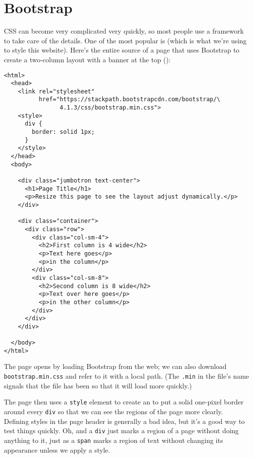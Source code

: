 \section{Bootstrap}\label{s:htmlcss-bootstrap}

CSS can become very complicated very quickly,
so most people use a framework to take care of the details.
One of the most popular is 
(which is what we're using to style this website).
Here's the entire source of a page that uses Bootstrap
to create a two-column layout with a banner at the top ():

\begin{verbatim}
<html>
  <head>
    <link rel="stylesheet"
          href="https://stackpath.bootstrapcdn.com/bootstrap/\
                4.1.3/css/bootstrap.min.css">
    <style>
      div {
        border: solid 1px;
      }
    </style>
  </head>
  <body>

    <div class="jumbotron text-center">
      <h1>Page Title</h1>
      <p>Resize this page to see the layout adjust dynamically.</p>
    </div>

    <div class="container">
      <div class="row">
        <div class="col-sm-4">
          <h2>First column is 4 wide</h2>
          <p>Text here goes</p>
          <p>in the column</p>
        </div>
        <div class="col-sm-8">
          <h2>Second column is 8 wide</h2>
          <p>Text over here goes</p>
          <p>in the other column</p>
        </div>
      </div>
    </div>

  </body>
</html>
\end{verbatim}


The page opens by loading Bootstrap from the web;
we can also download \texttt{bootstrap.min.css} and refer to it with a local path.
(The \texttt{.min} in the file's name signals that the file has been 
so that it will load more quickly.)

The page then uses a \texttt{style} element to create
an 
to put a solid one-pixel border around every \texttt{div}
so that we can see the regions of the page more clearly.
Defining styles in the page header is generally a bad idea,
but it's a good way to test things quickly.
Oh,
and a \texttt{div} just marks a region of a page without doing anything to it,
just as a \texttt{span} marks a region of text without changing its appearance
unless we apply a style.

